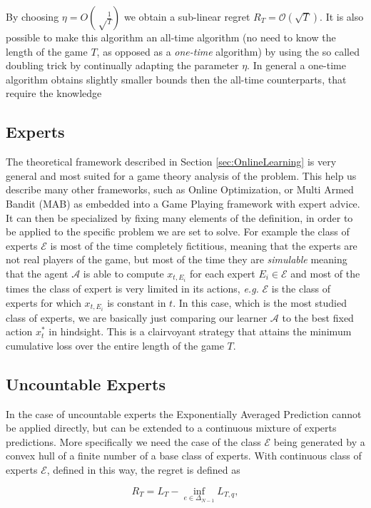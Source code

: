 By choosing $\eta=O\left(\sqrt\frac{1}{T}\right)$ we obtain a sub-linear regret $R_T=\mathcal O(\sqrt T)$. It is also possible to make this algorithm an all-time algorithm (no need to know the length of the game $T$, as opposed as a \emph{one-time} algorithm) by using the so called doubling trick by continually adapting the parameter $\eta$. In general a one-time algorithm obtains slightly smaller bounds then the all-time counterparts, that require the knowledge

\subsection{Experts}
The theoretical framework described in Section \ref{sec:OnlineLearning} is very general and most suited for a game theory analysis of the problem. This help us describe many other frameworks, such as Online Optimization, or Multi Armed Bandit (MAB) as embedded into a Game Playing framework with expert advice. It can then be specialized by fixing many elements of the definition, in order to be applied to the specific problem we are set to solve.
For example the class of experts $\mathcal E$ is most of the time completely fictitious, meaning that the experts are not real players of the game, but most of the time they are \emph{simulable} meaning that the agent $\mathcal A$ is able to compute $x_{t,E_i}$ for each expert $E_i\in\mathcal E$ and most of the times the class of expert is very limited in its actions, \emph{e.g.} $\mathcal E$ is the class of experts for which $x_{t,E_i}$ is constant in $t$. In this case, which is the most studied class of experts, we are basically just comparing our learner $\mathcal A$ to the best fixed action $x_t^*$ in hindsight. This is a clairvoyant strategy that attains the minimum cumulative loss over the entire length of the game $T$.

\subsection{Uncountable Experts}

In the case of uncountable experts the Exponentially Averaged Prediction cannot be applied directly, but can be extended to a continuous mixture of experts predictions. More specifically we need the case of the class $\mathcal E$ being generated by a convex hull of a finite number of a base class of experts. 
With continuous class of experts $\mathcal E$, defined in this way, the regret is defined as 

\begin{equation}
    R_T = L_T-\inf\limits_{e\in\Delta_{N-1}}L_{T,q},
\end{equation}


